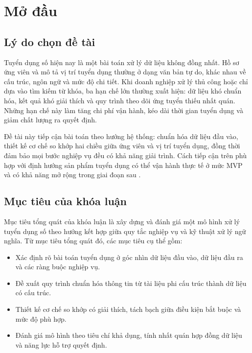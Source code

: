 \chapter*{Mở đầu}

\section*{Lý do chọn đề tài}

Tuyển dụng số hiện nay là một bài toán xử lý dữ liệu không đồng nhất. Hồ sơ ứng viên và mô tả vị trí tuyển dụng thường ở dạng văn bản tự do, khác nhau về cấu trúc, ngôn ngữ và mức độ chi tiết. Khi doanh nghiệp xử lý thủ công hoặc chỉ dựa vào tìm kiếm từ khóa, ba hạn chế lớn thường xuất hiện: dữ liệu khó chuẩn hóa, kết quả khó giải thích và quy trình theo dõi ứng tuyển thiếu nhất quán. Những hạn chế này làm tăng chi phí vận hành, kéo dài thời gian tuyển dụng và giảm chất lượng ra quyết định.

Đề tài này tiếp cận bài toán theo hướng hệ thống: chuẩn hóa dữ liệu đầu vào, thiết kế cơ chế so khớp hai chiều giữa ứng viên và vị trí tuyển dụng, đồng thời đảm bảo mọi bước nghiệp vụ đều có khả năng giải trình. Cách tiếp cận trên phù hợp với định hướng sản phẩm tuyển dụng có thể vận hành thực tế ở mức MVP và có khả năng mở rộng trong giai đoạn sau \cite{requirements,hld-overview}.

\section*{Mục tiêu của khóa luận}

Mục tiêu tổng quát của khóa luận là xây dựng và đánh giá một mô hình xử lý tuyển dụng số theo hướng kết hợp giữa quy tắc nghiệp vụ và kỹ thuật xử lý ngữ nghĩa. Từ mục tiêu tổng quát đó, các mục tiêu cụ thể gồm:

\begin{itemize}
  \item Xác định rõ bài toán tuyển dụng ở góc nhìn dữ liệu đầu vào, dữ liệu đầu ra và các ràng buộc nghiệp vụ.
  \item Đề xuất quy trình chuẩn hóa thông tin từ tài liệu phi cấu trúc thành dữ liệu có cấu trúc.
  \item Thiết kế cơ chế so khớp có giải thích, tách bạch giữa điều kiện bắt buộc và mức độ phù hợp.
  \item Đánh giá mô hình theo tiêu chí khả dụng, tính nhất quán hợp đồng dữ liệu và năng lực hỗ trợ quyết định.
\end{itemize}

